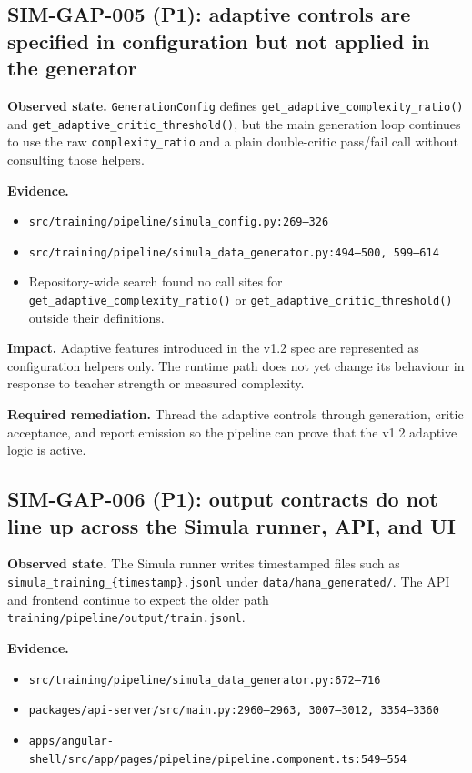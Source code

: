 \documentclass[12pt,a4paper,twoside]{report}
\begin{document}
\subsection*{SIM-GAP-005 (P1): adaptive controls are specified in configuration but not applied in the generator}
\textbf{Observed state.}
\texttt{GenerationConfig} defines
\texttt{get\_adaptive\_complexity\_ratio()} and
\texttt{get\_adaptive\_critic\_threshold()}, but the main generation
loop continues to use the raw \texttt{complexity\_ratio} and a plain
double-critic pass/fail call without consulting those helpers.

\textbf{Evidence.}
\begin{itemize}
\item \texttt{src/training/pipeline/simula\_config.py:269--326}
\item \texttt{src/training/pipeline/simula\_data\_generator.py:494--500, 599--614}
\item Repository-wide search found no call sites for
\texttt{get\_adaptive\_complexity\_ratio()} or
\texttt{get\_adaptive\_critic\_threshold()} outside their
definitions.
\end{itemize}

\textbf{Impact.}
Adaptive features introduced in the v1.2 spec are represented as
configuration helpers only. The runtime path does not yet change its
behaviour in response to teacher strength or measured complexity.

\textbf{Required remediation.}
Thread the adaptive controls through generation, critic acceptance,
and report emission so the pipeline can prove that the v1.2 adaptive
logic is active.

\subsection*{SIM-GAP-006 (P1): output contracts do not line up across the Simula runner, API, and UI}
\textbf{Observed state.}
The Simula runner writes timestamped files such as
\texttt{simula\_training\_\{timestamp\}.jsonl} under
\texttt{data/hana\_generated/}. The API and frontend continue to
expect the older path \texttt{training/pipeline/output/train.jsonl}.

\textbf{Evidence.}
\begin{itemize}
\item \texttt{src/training/pipeline/simula\_data\_generator.py:672--716}
\item \texttt{packages/api-server/src/main.py:2960--2963,
3007--3012, 3354--3360}
\item \texttt{apps/angular-shell/src/app/pages/pipeline/pipeline.component.ts:549--554}
\end{itemize}
\end{document}
